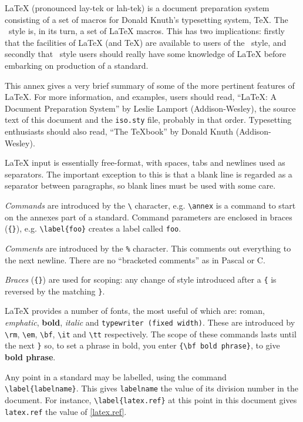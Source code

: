 LaTeX (pronounced lay-tek or lah-tek) is a document preparation system
consisting of a set of macros for Donald Knuth's typesetting system, TeX.
The \iso\ style is, in its turn, a set of LaTeX macros.
This has two implications: firstly that the facilities of LaTeX (and TeX) are
available to users of the \iso\ style, and secondly that \iso\ style users
should really have some knowledge of LaTeX before embarking on production of
a standard.

This annex gives a very brief summary of some of the more pertinent features
of LaTeX.
For more information, and examples, users should read, ``LaTeX: A Document
Preparation System'' by Leslie Lamport (Addison-Wesley), the source text of
this document and the \verb|iso.sty| file, probably in that order.
Typesetting enthusiasts should also read, ``The TeXbook'' by Donald Knuth
(Addison-Wesley).

LaTeX input is essentially free-format, with spaces, tabs and newlines used
as separators.
The important exception to this is that a blank line is regarded as a
separator between paragraphs, so blank lines must be used with some care.

{\em Commands\/} are introduced by the \verb|\| character, e.g.
\verb|\annex| is a command to start on the annexes part of a standard.
Command parameters are enclosed in braces (\verb|{}|), e.g.
\verb|\label{foo}| creates a label called \verb|foo|.

{\em Comments\/} are introduced by the \verb|%| character.
This comments out everything to the next newline.
There are no ``bracketed comments'' as in Pascal or C.

{\em Braces\/} (\verb|{}|) are used for scoping: any change of style
introduced after a \verb|{| is reversed by the matching \verb|}|.

\label{guide.fonts}
LaTeX provides a number of fonts, the most useful of which are:
{\rm roman}, {\em emphatic}, {\bf bold}, {\it italic} and {\tt typewriter
(fixed width)}.
These are introduced by \verb|\rm|, \verb|\em|, \verb|\bf|, \verb|\it| and
\verb|\tt| respectively.
The scope of these commands lasts until the next \verb|}| so, to set a 
phrase in bold, you enter \verb|{\bf bold phrase}|, to give
{\bf bold phrase}.

Any point in a standard may be labelled, using the command
\verb|\label{labelname}|.
This gives \verb|labelname| the value of its division number in the document.
For instance, \verb|\label{latex.ref}| at this point in this document
\label{latex.ref} 
gives \verb|latex.ref| the value of \ref{latex.ref}.

